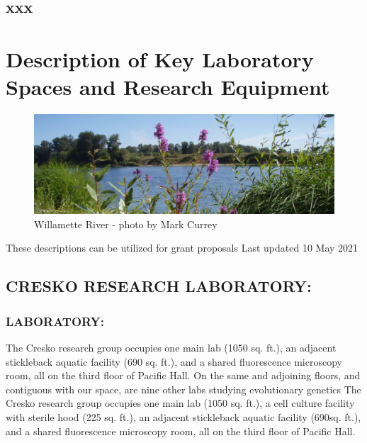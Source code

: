 \documentclass[
]{book}
\begin{document}
\hypertarget{xxx}{%
\section{xxx}\label{xxx}}

\hypertarget{description-of-key-laboratory-spaces-and-research-equipment}{%
\chapter{Description of Key Laboratory Spaces and Research Equipment}\label{description-of-key-laboratory-spaces-and-research-equipment}}

\begin{figure}
\centering
\includegraphics{images/willamette_header.jpg}
\caption{Willamette River - photo by Mark Currey}
\end{figure}

These descriptions can be utilized for grant proposals
Last updated 10 May 2021

\hypertarget{cresko-research-laboratory}{%
\section{CRESKO RESEARCH LABORATORY:}\label{cresko-research-laboratory}}

\hypertarget{laboratory}{%
\subsection{LABORATORY:}\label{laboratory}}

The Cresko research group occupies one main lab (1050 sq. ft.), an adjacent stickleback aquatic facility (690 sq. ft.), and a shared fluorescence microscopy room, all on the third floor of Pacific Hall. On the same and adjoining floors, and contiguous with our space, are nine other labs studying evolutionary genetics The Cresko research group occupies one main lab (1050 sq. ft.), a cell culture facility with sterile hood (225 sq. ft.), an adjacent stickleback aquatic facility (690sq. ft.), and a shared fluorescence microscopy room, all on the third floor of Pacific Hall.
\end{document}
